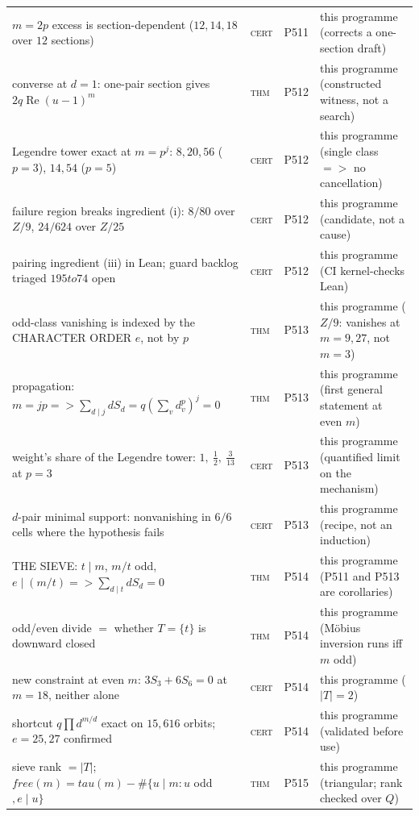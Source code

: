 \documentclass[12pt,a4paper]{article}
\def\mathbb#1{#1}%
\def\mathrm#1{#1}%
\def\mathbf#1{#1}%
\def\tau{tau}%
\def\to{ to }%
\def\Rightarrow{ => }%
\theoremstyle{definition}
\newcommand{\ZZ}{\mathbb{Z}}
\begin{document}
\begin{center}
\begin{tabular}{@{}p{}llp{}@{}}
$m{=}2p$ excess is section-dependent ($12,14,18$ over $12$ sections) & \textsc{cert} & P511 & this programme (corrects a one-section draft) \\
converse at $d{=}1$: one-pair section gives $2q\operatorname{Re}(u{-}1)^m$ & \textsc{thm} & P512 & this programme (constructed witness, not a search) \\
Legendre tower exact at $m{=}p^j$: $8,20,56$ ($p{=}3$), $14,54$ ($p{=}5$) & \textsc{cert} & P512 & this programme (single class $\Rightarrow$ no cancellation) \\
failure region breaks ingredient (i): $8/80$ over $\ZZ/9$, $24/624$ over $\ZZ/25$ & \textsc{cert} & P512 & this programme (candidate, not a cause) \\
pairing ingredient (iii) in Lean; guard backlog triaged $195\to74$ open & \textsc{cert} & P512 & this programme (CI kernel-checks Lean) \\
odd-class vanishing is indexed by the CHARACTER ORDER $e$, not by $p$ & \textsc{thm} & P513 & this programme ($\ZZ/9$: vanishes at $m{=}9,27$, not $m{=}3$) \\
propagation: $m{=}jp\Rightarrow\sum_{d\mid j}dS_d=q(\sum_v d_v^p)^j=0$ & \textsc{thm} & P513 & this programme (first general statement at even $m$) \\
weight's share of the Legendre tower: $1,\ \tfrac12,\ \tfrac3{13}$ at $p{=}3$ & \textsc{cert} & P513 & this programme (quantified limit on the mechanism) \\
$d$-pair minimal support: nonvanishing in $6/6$ cells where the hypothesis fails & \textsc{cert} & P513 & this programme (recipe, not an induction) \\
THE SIEVE: $t\mid m$, $m/t$ odd, $e\mid(m/t)\Rightarrow\sum_{d\mid t}dS_d=0$ & \textsc{thm} & P514 & this programme (P511 and P513 are corollaries) \\
odd/even divide $=$ whether $T=\{t\}$ is downward closed & \textsc{thm} & P514 & this programme (Möbius inversion runs iff $m$ odd) \\
new constraint at even $m$: $3S_3+6S_6=0$ at $m{=}18$, neither alone & \textsc{cert} & P514 & this programme ($\lvert T\rvert{=}2$) \\
shortcut $q\prod d^{m/d}$ exact on $15{,}616$ orbits; $e{=}25,27$ confirmed & \textsc{cert} & P514 & this programme (validated before use) \\
sieve rank $=\lvert T\rvert$; $\mathrm{free}(m)=\tau(m)-\#\{u\mid m: u$ odd$, e\mid u\}$ & \textsc{thm} & P515 & this programme (triangular; rank checked over $\mathbf Q$) \\

\end{tabular}
\end{center}
\end{document}
